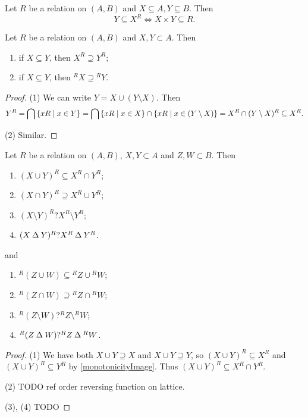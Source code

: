 \begin{lemma} \label{polarsCartesianProduct}
Let $R$ be a relation on $(A,B)$ and $X\subseteq A, Y\subseteq B$. Then
\[ Y\subseteq X^R \iff X\times Y \subseteq R. \]
\end{lemma}

\begin{corollary} \label{antitonicityPolars}
Let $R$ be a relation on $(A, B)$ and $X,Y\subset A$. Then
\begin{enumerate}
\item if $X\subseteq Y$, then $X^R \supseteq Y^R$;
\item if $X\subseteq Y$, then ${^RX} \supseteq {^RY}$.
\end{enumerate}
\end{corollary}
\begin{proof}
(1) We can write $Y = X \cup (Y\setminus X)$. Then
\[ Y^R = \bigcap \left\{ xR \;\middle|\; x\in Y \right\} = \bigcap \left\{ xR \;\middle|\; x\in X \right\}\cap\left\{ xR \;\middle|\; x\in (Y\setminus X) \right\} = X^R \cap (Y\setminus X)^R \subseteq X^R. \]

(2) Similar.
\end{proof}
\begin{corollary} \label{polarasRelation}
Let $R$ be a relation on $(A, B)$, $X,Y\subset A$ and $Z,W\subset B$. Then
\begin{enumerate}
\item $(X\cup Y)^R \subseteq X^R\cap Y^R$;
\item $(X\cap Y)^R \supseteq X^R\cup Y^R$;
\item $(X\setminus Y)^R ? X^R\setminus Y^R$;
\item $(X\mathbin{\Delta} Y)^R ? X^R\mathbin{\Delta} Y^R$.
\end{enumerate}
and
\begin{enumerate}
\item $^R(Z\cup W) \subseteq {^RZ}\cup {^RW}$;
\item $^R(Z\cap W) \supseteq {^RZ}\cap {^RW}$;
\item $^R(Z\setminus W) ? {^RZ}\setminus {^RW}$;
\item $^R(Z\mathbin{\Delta} W) ? {^RZ}\mathbin{\Delta} {^RW}$.
\end{enumerate}
\end{corollary}
\begin{proof}\mbox{}
(1) We have both $X\cup Y \supseteq X$ and $X\cup Y \supseteq Y$, so $(X\cup Y)^R \subseteq X^R$ and $(X\cup Y)^R \subseteq Y^R$ by \ref{monotonicityImage}. Thus $(X\cup Y)^R \subseteq X^R\cap Y^R$.

(2) TODO ref order reversing function on lattice.

(3), (4) TODO
\end{proof}

